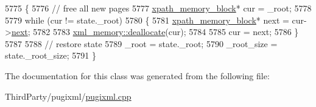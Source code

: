 \begin{DoxyCode}
5775         \{
5776             \textcolor{comment}{// free all new pages}
5777             \hyperlink{structxpath__memory__block}{xpath\_memory\_block}* cur = \_root;
5778 
5779             \textcolor{keywordflow}{while} (cur != state.\_root)
5780             \{
5781                 \hyperlink{structxpath__memory__block}{xpath\_memory\_block}* next = cur->\hyperlink{structxpath__memory__block_ab7f0d8400b40a51cdb063e76fd19a93c}{next};
5782 
5783                 \hyperlink{structxml__memory__management__function__storage_a1c80a9a045ed6cfb90b17a178e4b3512}{xml\_memory::deallocate}(cur);
5784 
5785                 cur = next;
5786             \}
5787 
5788             \textcolor{comment}{// restore state}
5789             \_root = state.\_root;
5790             \_root\_size = state.\_root\_size;
5791         \}
\end{DoxyCode}


The documentation for this class was generated from the following file\-:\begin{DoxyCompactItemize}
\item 
Third\-Party/pugixml/\hyperlink{pugixml_8cpp}{pugixml.\-cpp}\end{DoxyCompactItemize}
